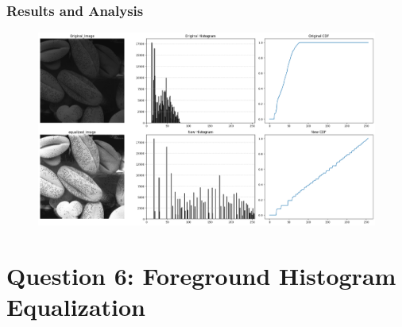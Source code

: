 \documentclass[11pt]{article}
\begin{document}
\subsubsection*{Results and Analysis}
\begin{figure}[H]
    \centering
    \includegraphics[width=1\linewidth]{resources/custom_his_eq.png}
    \label{fig:placeholder}
\end{figure}
\newpage
\section*{Question 6: Foreground Histogram Equalization}
\end{document}
